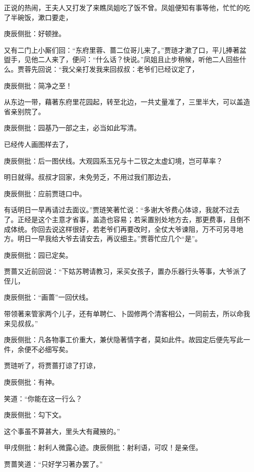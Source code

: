 \begin{parag}


    正说的热闹，王夫人又打发了来瞧凤姐吃了饭不曾。凤姐便知有事等他，忙忙的吃了半碗饭，漱口要走，\begin{note}庚辰侧批：好顿挫。\end{note}又有二门上小厮们回：“东府里蓉、蔷二位哥儿来了。”贾琏才漱了口，平儿捧著盆盥手，见他二人来了，便问：“什么话？快说。”凤姐且止步稍候，听他二人回些什么。贾蓉先回说：“我父亲打发我来回叔叔：老爷们已经议定了，\begin{note}庚辰侧批：简净之至！\end{note}从东边一带，藉著东府里花园起，转至北边，一共丈量准了，三里半大，可以盖造省亲别院了。\begin{note}庚辰侧批：园基乃一部之主，必当如此写清。\end{note}已经传人画图样去了，\begin{note}庚辰侧批：后一图伏线。大观园系玉兄与十二钗之太虚幻境，岂可草率？\end{note}明日就得。叔叔才回家，未免劳乏，不用过我们那边去，\begin{note}庚辰侧批：应前贾琏口中。\end{note}有话明日一早再请过去面议。”贾琏笑著忙说：“多谢大爷费心体谅，我就不过去了。正经是这个主意才省事，盖造也容易；若采置别处地方去，那更费事，且倒不成体统。你回去说这样很好，若老爷们再要改时，全仗大爷谏阻，万不可另寻地方。明日一早我给大爷去请安去，再议细主。”贾蓉忙应几个“是”。\begin{note}庚辰侧批：园已定矣。\end{note}
\end{parag}


\begin{parag}


    贾蔷又近前回说：“下姑苏聘请教习，采买女孩子，置办乐器行头等事，大爷派了侄儿，\begin{note}庚辰侧批：“画蔷”一回伏线。\end{note}带领著来管家两个儿子，还有单聘仁、卜固修两个清客相公，一同前去，所以命我来见叔叔。”\begin{note}庚辰侧批：凡各物事工价重大，兼伏隐著情字者，莫如此件。故园定后便先写此一件，余便不必细写矣。\end{note}贾琏听了，将贾蔷打谅了打谅，\begin{note}庚辰侧批：有神。\end{note}笑道：“你能在这一行么？\begin{note}庚辰侧批：勾下文。\end{note}这个事虽不算甚大，里头大有藏掖的。”\begin{note}甲戌侧批：射利人微露心迹。庚辰侧批：射利语，可叹！是亲侄。\end{note}贾蔷笑道：“只好学习著办罢了。”
\end{parag}


